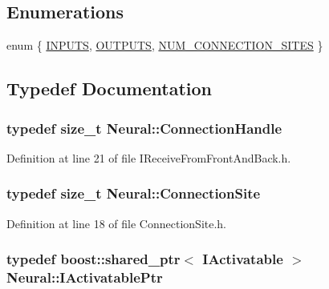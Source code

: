 \subsection*{Enumerations}
\begin{DoxyCompactItemize}
\item 
enum \{ \hyperlink{namespace_neural_afb89d8135ca549d1727f726fa2c5c09aab26ea0333c6fa6a3f9644cb4a22ced81}{INPUTS}, 
\hyperlink{namespace_neural_afb89d8135ca549d1727f726fa2c5c09aafaf7a672cb9c197a10dd37ada9988340}{OUTPUTS}, 
\hyperlink{namespace_neural_afb89d8135ca549d1727f726fa2c5c09aad44b9ed73ba291400e791a43a40e2c98}{NUM\_\-CONNECTION\_\-SITES}
 \}
\end{DoxyCompactItemize}


\subsection{Typedef Documentation}
\hypertarget{namespace_neural_a73b2763d14999ad4308dbf4246aa503f}{
\subsubsection[{ConnectionHandle}]{\setlength{\rightskip}{0pt plus 5cm}typedef size\_\-t {\bf Neural::ConnectionHandle}}}
\label{namespace_neural_a73b2763d14999ad4308dbf4246aa503f}


Definition at line 21 of file IReceiveFromFrontAndBack.h.

\hypertarget{namespace_neural_add871cb0324e8abfb693026afba3a621}{
\subsubsection[{ConnectionSite}]{\setlength{\rightskip}{0pt plus 5cm}typedef size\_\-t {\bf Neural::ConnectionSite}}}
\label{namespace_neural_add871cb0324e8abfb693026afba3a621}


Definition at line 18 of file ConnectionSite.h.

\hypertarget{namespace_neural_a2c97f9785f7a89940e070ce1eb702050}{
\subsubsection[{IActivatablePtr}]{\setlength{\rightskip}{0pt plus 5cm}typedef boost::shared\_\-ptr$<$ {\bf IActivatable} $>$ {\bf Neural::IActivatablePtr}}}
\label{namespace_neural_a2c97f9785f7a89940e070ce1eb702050}



